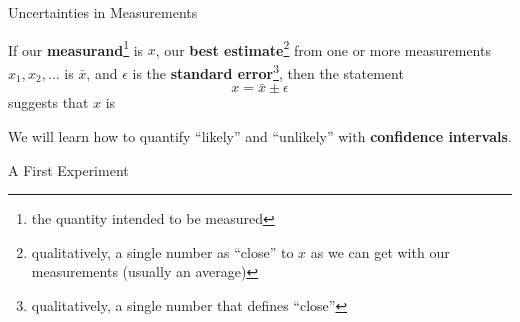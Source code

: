 \documentclass[aspectratio=1610]{beamer}
\begin{document}
\begin{frame}{Uncertainties in Measurements}

If our
{\bf measurand}\footnote{the quantity intended to be measured}
is $x$,  our
{\bf best estimate}\footnote{qualitatively, a single number as ``close'' to $x$ as we can get with our measurements (usually an average)}
from one or more measurements $x_1, x_2, \ldots$ is $\bar{x}$, and $\epsilon$ is the
{\bf standard error}\footnote{qualitatively, a single number that defines ``close''},
then the statement
\begin{equation*}
x = \bar{x} \pm \epsilon
\end{equation*}
suggests that $x$ is
 
\vspace{0.25cm}


\vfill 
\pause 

We will learn how to quantify ``likely'' and ``unlikely'' with {\bf confidence intervals}.

\end{frame}


\begin{frame}{A First Experiment}

\end{frame}
\end{document}
